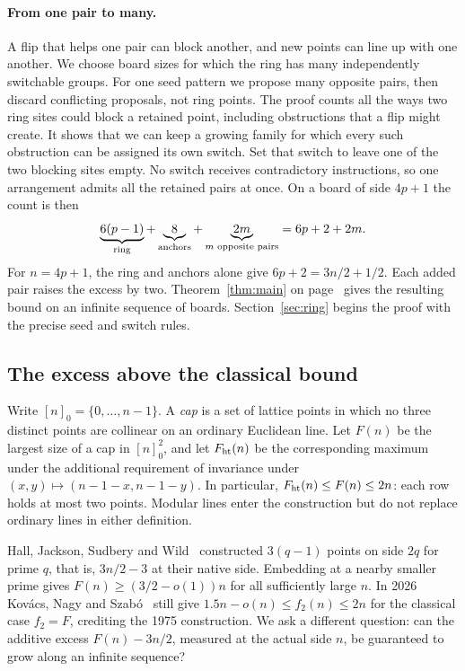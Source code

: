 \documentclass[11pt]{article}
\newcommand{\mathcopy}[2]{\ifdefined\pdfliteral
  \pdfliteral direct{/Span << /ActualText <\pdfescapehex{\detokenize{#1}}> >> BDC}#2\pdfliteral direct{EMC}%
  \else#2\fi}
\begin{document}
\paragraph{From one pair to many.} A flip that helps one pair can block another, and new points can line up with one another. We choose board sizes for which the ring has many independently switchable groups. For one seed pattern we propose many opposite pairs, then discard conflicting proposals, not ring points. The proof counts all the ways two ring sites could block a retained point, including obstructions that a flip might create. It shows that we can keep a growing family for which every such obstruction can be assigned its own switch. Set that switch to leave one of the two blocking sites empty. No switch receives contradictory instructions, so one arrangement admits all the retained pairs at once. On a board of side $4p+1$ the count is then
\[
 \mathcopy{6(p-1) ring points + 8 anchors + 2m points from m opposite pairs = 6p + 2 + 2m.}{\underbrace{6(p-1)}_{\text{ring}}+\underbrace{8}_{\text{anchors}}+\underbrace{2m}_{m\text{ opposite pairs}}=6p+2+2m.}
\]
For $n=4p+1$, the ring and anchors alone give $6p+2=3n/2+1/2$. Each added pair raises the excess by two. Theorem~\ref{thm:main} on page~\pageref{thm:main} gives the resulting bound on an infinite sequence of boards. Section~\ref{sec:ring} begins the proof with the precise seed and switch rules.

\clearpage
\subsection{The excess above the classical bound}\label{sec:main-result}
Write $[n]_0=\{0,\ldots,n-1\}$. A \emph{cap} is a set of lattice points in which no three distinct points are collinear on an ordinary Euclidean line. Let $F(n)$ be the largest size of a cap in $[n]_0^2$, and let $F_{\mathrm{ht}}(n)$ be the corresponding maximum under the additional requirement of invariance under $(x,y)\mapsto(n-1-x,n-1-y)$. In particular, $F_{\mathrm{ht}}(n)\le F(n)\le 2n$: each row holds at most two points. Modular lines enter the construction but do not replace ordinary lines in either definition.

Hall, Jackson, Sudbery and Wild~\cite[Theorem 2]{hjsw} constructed $3(q-1)$ points on side $2q$ for prime $q$, that is, $3n/2-3$ at their native side. Embedding at a nearby smaller prime gives $F(n)\ge (3/2-o(1))n$ for all sufficiently large $n$. In 2026 Kov\'acs, Nagy and Szab\'o~\cite[Definition 1.1 and Theorem 1.2]{kns} still give $1.5n-o(n)\le f_2(n)\le 2n$ for the classical case $f_2=F$, crediting the 1975 construction. We ask a different question: can the additive excess $F(n)-3n/2$, measured at the actual side $n$, be guaranteed to grow along an infinite sequence?
\end{document}
